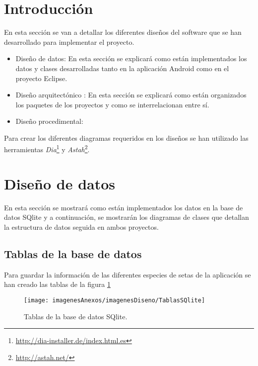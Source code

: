 
\section{Introducción}

En esta sección se van a detallar los diferentes diseños del software que se han desarrollado para implementar el proyecto.

\begin{itemize}
	\item Diseño de datos: En esta sección se explicará como están implementados los datos y clases desarrolladas tanto en la aplicación Android como en el proyecto Eclipse.
	\item Diseño arquitectónico : En esta sección se explicará como están organizados los paquetes de los proyectos y como se interrelacionan entre sí.
	\item Diseño procedimental: 
\end{itemize}

Para crear los diferentes diagramas requeridos en los diseños se han utilizado las herramientas \textit{Dia}\footnote{\url{http://dia-installer.de/index.html.es}} y \textit{Astah}\footnote{\url{http://astah.net/}}.

\section{Diseño de datos}

En esta sección se mostrará como están implementados los datos en la base de datos SQlite y a continuación, se mostrarán los diagramas de clases que detallan la estructura de datos seguida en ambos proyectos.

\subsection{Tablas de la base de datos}

Para guardar la información de las diferentes especies de setas de la aplicación se han creado las tablas de la figura \ref{figTablasSQlite}

\begin{figure}[h]
    \begin{center}%
        \begin{center}%
          \texttt{[image: imagenesAnexos/imagenesDiseno/TablasSQlite]}%
          \caption{Tablas de la base de datos SQlite.}%
          \label{figTablasSQlite}%
        \end{center}%
  	\end{center}%
\end{figure}%

